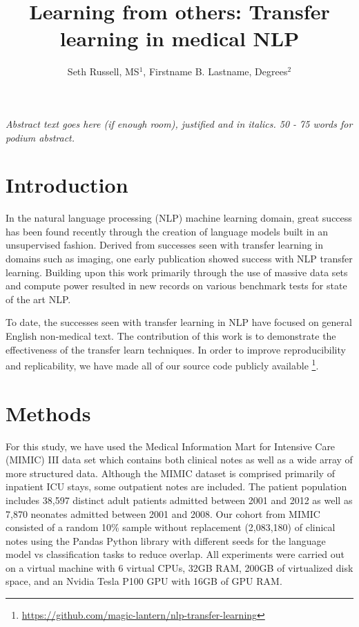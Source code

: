 \documentclass{amia}
\begin{document}
\title{Learning from others: Transfer learning in medical NLP}

\author{Seth Russell, MS$^{1}$, Firstname B. Lastname, Degrees$^{2}$}


\maketitle


\textit{Abstract text goes here (if enough room),  justified and in italics.  50 - 75 words for podium abstract.}

\section*{Introduction}

In the natural language processing (NLP) machine learning domain, great success has been found recently through the creation of language models built in an unsupervised fashion. Derived from successes seen with transfer learning in domains such as imaging, one early publication \cite{howard_universal_2018} showed success with NLP transfer learning. Building upon this work primarily through the use of massive data sets and compute power \cite{radford_improving_2018,radford_language_2019} resulted in new records on various benchmark tests for state of the art NLP.

To date, the successes seen with transfer learning in NLP have focused on general English non-medical text. The contribution of this work is to demonstrate the effectiveness of the transfer learn techniques. In order to improve reproducibility and replicability, we have made all of our source code publicly available \footnote{\url{https://github.com/magic-lantern/nlp-transfer-learning}}.

\section*{Methods}

For this study, we have used the Medical Information Mart for Intensive Care (MIMIC) III \cite{johnson_mimic-iii_2016} data set which contains both clinical notes as well as a wide array of more structured data. Although the MIMIC dataset is comprised primarily of inpatient ICU stays, some outpatient notes are included. The patient population includes 38,597 distinct adult patients admitted between 2001 and 2012 as well as 7,870 neonates admitted between 2001 and 2008. Our cohort from MIMIC consisted of a random 10\% sample without replacement (2,083,180) of clinical notes using the Pandas Python library \cite{mckinney-proc-scipy-2010} with different seeds for the language model vs classification tasks to reduce overlap. All experiments were carried out on a virtual machine with 6 virtual CPUs, 32GB RAM, 200GB of virtualized disk space, and an Nvidia Tesla P100 GPU with 16GB of GPU RAM. 
\end{document}
